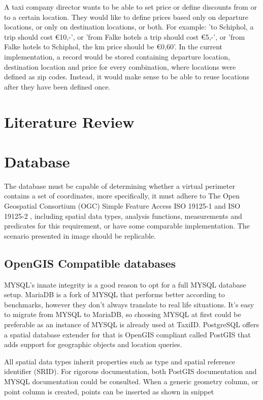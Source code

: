 A taxi company director wants to be able to set price or define discounts from or to a certain location. They would like to define prices based only on departure locations, or only on destination locations, or both. For example: 'to Schiphol, a trip should cost \euro 10,-', or 'from Falke hotels a trip should cost \euro 5,-', or 'from Falke hotels to Schiphol, the km price should be \euro 0,60'. In the current implementation, a record would be stored containing departure location, destination location and price for every combination, where locations were defined as zip codes. Instead, it would make sense to be able to reuse locations after they have been defined once.

\section{Literature Review}


\section{Database}

The database must be capable of determining whether a virtual perimeter contains a set of coordinates, more specifically, it must adhere to The Open Geospatial Consortium (OGC) Simple Feature Access ISO 19125-1  and ISO 19125-2 , including spatial data types, analysis functions, measurements and predicates for this requirement, or have some comparable implementation. The scenario presented in image  should be replicable.

\subsection{OpenGIS Compatible databases}

MYSQL’s innate integrity is a good reason to opt for a full MYSQL database setup. MariaDB is a fork of MYSQL that performs better according to benchmarks, however they don’t always translate to real life situations. It’s easy to migrate from MYSQL to MariaDB, so choosing MYSQL at first could be preferable as an instance of MYSQL is already used at TaxiID. PostgreSQL offers a spatial database extender for that is OpenGIS compliant called PostGIS that adds support for geographic objects and location queries.

All spatial data types inherit properties such as type and spatial reference identifier (SRID). For rigorous documentation, both PostGIS documentation  and MYSQL documentation  could be consulted. When a generic geometry column, or point column is created, points can be inserted as shown in snippet 


